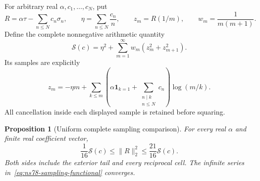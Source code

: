 \documentclass[11pt]{article}
\newtheorem{proposition}[theorem]{Proposition}
\theoremstyle{remark}
\begin{document}
For arbitrary real $\alpha,c_1,\ldots,c_N$, put
\[
 R=\alpha\tau-\sum_{n\leq N}c_n\sigma_n,\qquad
 \eta=\sum_{n\leq N}\frac{c_n}{n},\qquad
 z_m=R(1/m),\qquad w_m=\frac1{m(m+1)}.
\]
Define the complete nonnegative arithmetic quantity
\begin{equation}
 \mathcal S(c)=\eta^2+
       \sum_{m=1}^\infty w_m(z_m^2+z_{m+1}^2).
 \label{eq:ns78-sampling-functional}
\end{equation}
Its samples are explicitly
\[
 z_m=-\eta m+\sum_{k\leq m}
 \left(\alpha\mathbf1_{k=1}+\sum_{\substack{n\mid k\\n\leq N}}c_n\right)
                    \log(m/k).
\]
All cancellation inside each displayed sample is retained before squaring.

\begin{proposition}[Uniform complete sampling comparison]
\label{prop:ns78-sampling}
For every real $\alpha$ and finite real coefficient vector,
\begin{equation}
 \frac1{16}\mathcal S(c)\leq\|R\|_2^2
                 \leq\frac{21}{16}\mathcal S(c).
 \label{eq:ns78-sampling-comparison}
\end{equation}
Both sides include the exterior tail and every reciprocal cell. The
infinite series in~\eqref{eq:ns78-sampling-functional} converges.
\end{proposition}
\end{document}
